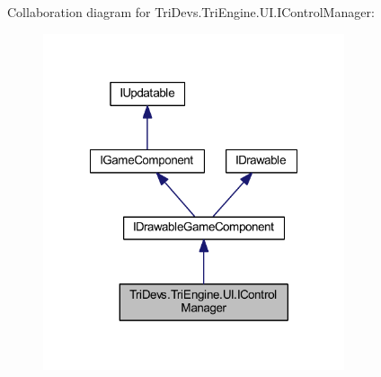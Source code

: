 Collaboration diagram for Tri\-Devs.\-Tri\-Engine.\-U\-I.\-I\-Control\-Manager\-:
\nopagebreak
\begin{figure}[H]
\begin{center}
\leavevmode
\includegraphics[width=251pt]{interface_tri_devs_1_1_tri_engine_1_1_u_i_1_1_i_control_manager__coll__graph}
\end{center}
\end{figure}

